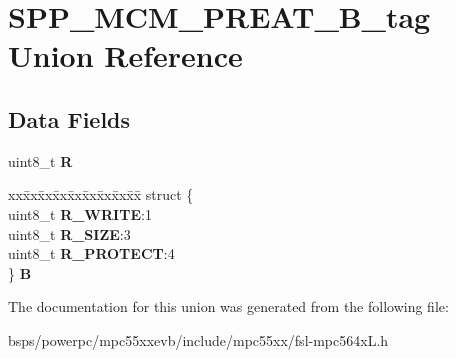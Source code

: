 \hypertarget{unionSPP__MCM__PREAT__8B__tag}{}\section{S\+P\+P\+\_\+\+M\+C\+M\+\_\+\+P\+R\+E\+A\+T\+\_\+B\+\_\+tag Union Reference}
\label{unionSPP__MCM__PREAT__8B__tag}
\subsection*{Data Fields}
\begin{DoxyCompactItemize}
\item 
\mbox{\label{unionSPP__MCM__PREAT__8B__tag_a80d59f0f0486f094653acbf8dd5f66bf}} 
uint8\+\_\+t {\bfseries R}
\item 
\mbox{\label{unionSPP__MCM__PREAT__8B__tag_a2c836a5d24384bafe54180378c21a29b}} 
\begin{tabbing}
xx\=xx\=xx\=xx\=xx\=xx\=xx\=xx\=xx\=\kill
struct \{\\
\>uint8\_t {\bfseries R\_WRITE}:1\\
\>uint8\_t {\bfseries R\_SIZE}:3\\
\>uint8\_t {\bfseries R\_PROTECT}:4\\
\} {\bfseries B}\\

\end{tabbing}\end{DoxyCompactItemize}


The documentation for this union was generated from the following file\+:\begin{DoxyCompactItemize}
\item 
bsps/powerpc/mpc55xxevb/include/mpc55xx/fsl-\/mpc564x\+L.\+h\end{DoxyCompactItemize}
